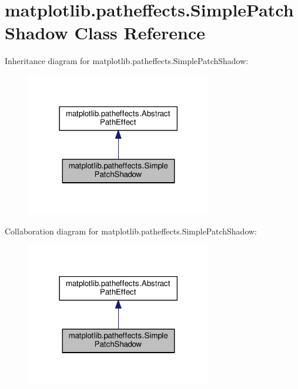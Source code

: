 \hypertarget{classmatplotlib_1_1patheffects_1_1SimplePatchShadow}{}\section{matplotlib.\+patheffects.\+Simple\+Patch\+Shadow Class Reference}
\label{classmatplotlib_1_1patheffects_1_1SimplePatchShadow}


Inheritance diagram for matplotlib.\+patheffects.\+Simple\+Patch\+Shadow\+:
\nopagebreak
\begin{figure}[H]
\begin{center}
\leavevmode
\includegraphics[width=230pt]{classmatplotlib_1_1patheffects_1_1SimplePatchShadow__inherit__graph}
\end{center}
\end{figure}


Collaboration diagram for matplotlib.\+patheffects.\+Simple\+Patch\+Shadow\+:
\nopagebreak
\begin{figure}[H]
\begin{center}
\leavevmode
\includegraphics[width=230pt]{classmatplotlib_1_1patheffects_1_1SimplePatchShadow__coll__graph}
\end{center}
\end{figure}

